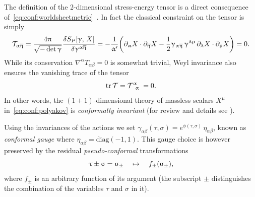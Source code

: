 The definition of the 2-dimensional stress-energy tensor is a direct consequence of~\eqref{eq:conf:worldsheetmetric}~\cite{Green:1988:SuperstringTheoryIntroduction}.
In fact the classical constraint on the tensor is simply
\begin{equation}
  \cT_{\alpha\beta}
  =
  \frac{4 \pi}{\sqrt{- \det \gamma}}
  \fdv{S_P\qty[\gamma,\, X]}{\gamma^{\alpha\beta}}
  =
  -\frac{1}{\ap}
  \qty(
    \ipd{\alpha} X \cdot \ipd{\beta} X
    -
    \frac{1}{2} \gamma_{\alpha\beta}\,
    \gamma^{\lambda\rho}\,
    \ipd{\lambda} X \cdot \ipd{\rho} X
  )
  =
  0.
  \label{eq:conf:stringT}
\end{equation}
While its conservation $\nabla^{\alpha} T_{\alpha\beta} = 0$ is somewhat trivial, Weyl invariance also ensures the vanishing trace of the tensor
\begin{equation}
  \trace{\cT} = \tensor{\cT}{^{\alpha}_{\alpha}} = 0.
\end{equation}
In other words, the $(1 + 1)$-dimensional theory of massless scalars $X^{\mu}$ in~\eqref{eq:conf:polyakov} is \emph{conformally invariant} (for review and details see \cite{Friedan:1986:ConformalInvarianceSupersymmetry,DiFrancesco:1997:ConformalFieldTheory,Blumenhagen:2009:IntroductionConformalField}).

Using the invariances of the actions we set $\gamma_{\alpha\beta}(\tau, \sigma) = e^{\phi(\tau, \sigma)}\, \eta_{\alpha\beta}$, known as \emph{conformal gauge} where $\eta_{\alpha\beta} = \mathrm{diag}(-1, 1)$.
This gauge choice is however preserved by the residual \emph{pseudo-conformal} transformations
\begin{equation}
  \uptau \pm \upsigma = \upsigma_{\pm} \quad \mapsto \quad f_{\pm}\qty(\upsigma_{\pm}),
  \label{eq:conf:residualgauge}
\end{equation}
where $f_{\pm}$ is an arbitrary function of its argument (the subscript $\pm$ distinguishes the combination of the variables $\tau$ and $\sigma$ in it).

